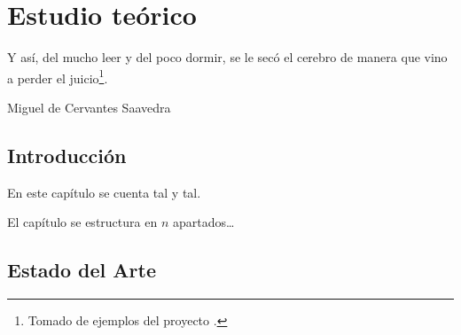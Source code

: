 %
%
%
% 
%
%
%
%

\chapter{Estudio teórico}
\label{cha:estudio-teorico}

\begin{FraseCelebre}
  \begin{Frase}
    Y así, del mucho leer y del poco dormir, se le secó el cerebro de manera que vino a perder el juicio\footnote{Tomado de ejemplos del proyecto \texis{}.}.
  \end{Frase}
  \begin{Fuente}
    Miguel de Cervantes Saavedra
  \end{Fuente}
\end{FraseCelebre}


\section{Introducción}
\label{sec:introduccion-teoria}

En este capítulo se cuenta tal y tal.

El capítulo se estructura en $n$ apartados\ldots


\section{Estado del Arte}
\label{sec:estadoarte}

